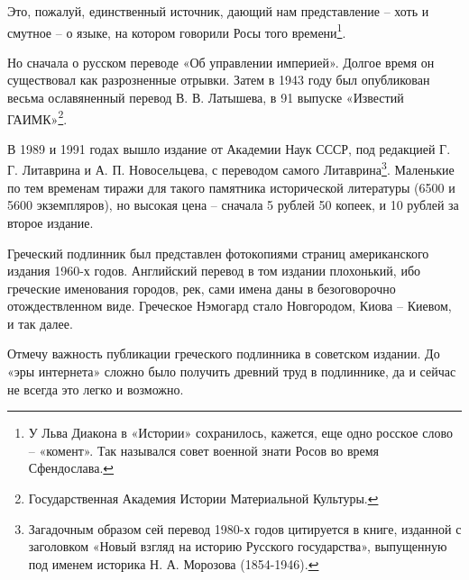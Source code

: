 Это, пожалуй, единственный источник, дающий нам представление – хоть и смутное – о языке, на котором говорили Росы того времени\footnote{У Льва Диакона в «Истории» сохранилось, кажется, еще одно росское слово – «комент». Так назывался совет военной знати Росов во время Сфендослава.}. 

Но сначала о русском переводе «Об управлении империей». Долгое время он существовал как разрозненные отрывки. Затем в 1943 году был опубликован весьма ославяненный перевод В. В. Латышева, в 91 выпуске «Известий ГАИМК»\footnote{Государственная Академия Истории Материальной Культуры.}. 

В 1989 и 1991 годах вышло издание\cite{kbagr01} от Академии Наук СССР, под редакцией Г. Г. Литаврина и А. П. Новосельцева, с переводом самого Литаврина\footnote{Загадочным образом сей перевод 1980-х годов цитируется в книге, изданной с заголовком «Новый взгляд на историю Русского государства», выпущенную под именем историка Н. А. Морозова (1854-1946).}. Маленькие по тем временам тиражи для такого памятника исторической литературы (6500 и 5600 экземпляров), но высокая цена – сначала 5 рублей 50 копеек, и 10 рублей за второе издание. 

Греческий подлинник был представлен фотокопиями страниц американского издания 1960-х годов. Английский перевод в том издании плохонький, ибо греческие именования городов, рек, сами имена даны в безоговорочно отождествленном виде. Греческое Нэмогард стало Новгородом, Киова – Киевом, и так далее.

Отмечу важность публикации греческого подлинника в советском издании. До «эры интернета» сложно было получить древний труд в подлиннике, да и сейчас не всегда это легко и возможно.




